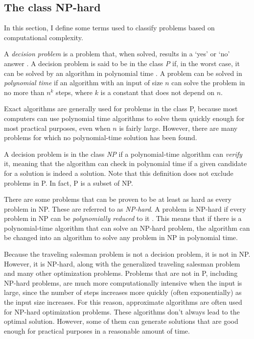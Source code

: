 \documentclass{sig-alternate}
\begin{document}
\subsection{The class NP-hard}
\label{subs:NPhard}
In this section, I define some terms used to classify problems based on computational complexity. 

A \textit{decision problem} is a problem that, when solved, results in a `yes' or `no' answer \cite{Sipser:2013}. A decision problem is said to be in the class \textit{P} if, in the worst case, it can be solved by an algorithm in polynomial time \cite{Papadimitriou:1982}. A problem can be solved in \textit{polynomial time} if an algorithm with an input of size $n$ can solve the problem in no more than $n^{k}$ steps, where $k$ is a constant that does not depend on $n$. 

Exact algorithms are generally used for problems in the class P, because most computers can use polynomial time algorithms to solve them quickly enough for most practical purposes, even when $n$ is fairly large. However, there are many problems for which no polynomial-time solution has been found. 


A decision problem is in the class \textit{NP} if a polynomial-time algorithm can \textit{verify} it, meaning that the algorithm can check in polynomial time if a given candidate for a solution is indeed a solution. Note that this definition does not exclude problems in P. In fact, P is a subset of NP. 

There are some problems that can be proven to be at least as hard as every problem in NP. These are referred to as \textit{NP-hard}. A problem is NP-hard if every problem in NP can be \textit{polynomially reduced} to it  \cite{Papadimitriou:1982}. This means that if there is a polynomial-time algorithm that can solve an NP-hard problem, the algorithm can be changed into an algorithm to solve any problem in NP in polynomial time. 


Because the traveling salesman problem is not a decision problem, it is not in NP. However, it is NP-hard, along with the generalized traveling salesman problem and many other optimization problems. Problems that are not in P, including NP-hard problems, are much more computationally intensive when the input is large, since the number of steps increases more quickly (often exponentially) as the input size increases. For this reason, approximate algorithms are often used for NP-hard optimization problems. These algorithms don't always lead to the optimal solution. However, some of them can generate solutions that are good enough for practical purposes in a reasonable amount of time. 
\end{document}
